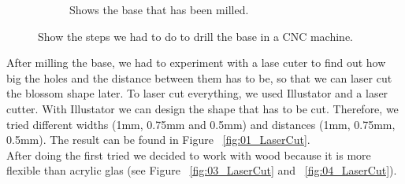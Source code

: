 \documentclass[doc.tex]{subfiles}
\begin{document}
\begin{figure}[H]
\begin{subfigure}{.45\textwidth}
            \caption{Shows the base that has been milled.}
            \label{fig:blossomBase}
            \vspace{6mm}
        \end{subfigure}
        \caption{Show the steps we had to do to drill the base in a CNC machine.}
        \label{fig:laserCutTests}
    \end{figure}


    \noindent
    After milling the base, we had to experiment with a lase cuter to find out how big the holes and the distance between them 
    has to be, so that we can laser cut the blossom shape later. To laser cut everything, we used Illustator\cite{illustrator} 
    and a laser cutter. With Illustator we can design the shape that has to be cut. Therefore, we tried different widths (1mm, 
    0.75mm and 0.5mm) and distances (1mm, 0.75mm, 0.5mm). The result can be found in Figure ~\ref{fig:01_LaserCut}.\\
    \noindent
    After doing the first tried we decided to work with wood because it is more flexible 
    than acrylic glas (see Figure ~\ref{fig:03_LaserCut} and ~\ref{fig:04_LaserCut}).
\end{document}
